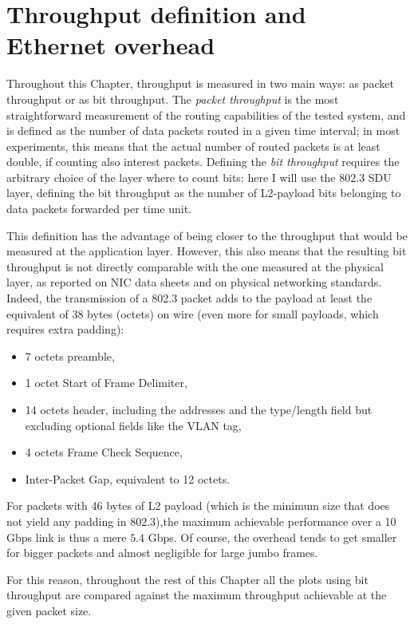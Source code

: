 \documentclass[11pt,a4paper,twoside,titlepage,openany]{book}
\begin{document}
\section{Throughput definition and Ethernet overhead}\label{sec:test.overhead}
Throughout this Chapter, throughput is measured in two main ways: as packet throughput or as bit throughput.
The \emph{packet throughput} is the most straightforward measurement of the routing capabilities of the tested system, and is defined as the number of data packets routed in a given time interval; in most experiments, this means that the actual number of routed packets is at least double, if counting also interest packets.
Defining the \emph{bit throughput} requires the arbitrary choice of the layer where to count bits: here I will use the 802.3 \gls{SDU} layer, defining the bit throughput as the number of L2-payload bits belonging to data packets forwarded per time unit.

This definition has the advantage of being closer to the throughput that would be measured at the application layer. However, this also means that the resulting bit throughput is not directly comparable with the one measured at the physical layer, as reported on NIC data sheets and on physical networking standards.
Indeed,  the transmission of a 802.3 packet adds to the payload at least the equivalent of 38 bytes (octets) on wire \cite{ethernet} (even more for small payloads, which requires extra padding):
\begin{itemize}[noitemsep,nolistsep]
\item 7 octets preamble,
\item 1 octet Start of Frame Delimiter,
\item 14 octets header, including the addresses and the type/length field but excluding optional fields like the VLAN tag,
\item 4 octets Frame Check Sequence,
\item Inter-Packet Gap, equivalent to 12 octets.
\end{itemize}
For packets with 46 bytes of L2 payload (which is the minimum size that does not yield any padding in 802.3),the maximum achievable performance over a 10 Gbps link is thus a mere $5.4$ Gbps. Of course, the overhead tends to get smaller for bigger packets and almost negligible for large jumbo frames.

For this reason, throughout the rest of this Chapter all the plots using bit throughput are compared against the maximum throughput achievable at the given packet size.
\end{document}
